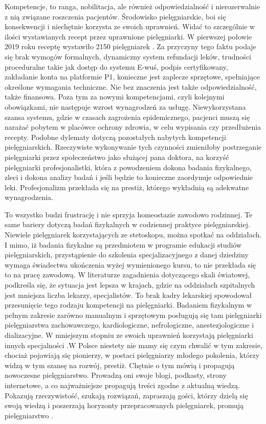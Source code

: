 \documentclass[a4paper,12pt,twoside,openright]{mwrep}
\begin{document}
Kompetencje, to ranga, nobilitacja, ale również odpowiedzialność i nierozerwalnie z nią związane roszczenia pacjentów. Środowisko pielęgniarskie, boi się konsekwencji i niechętnie korzysta ze swoich uprawnień. Widać to szczególnie w ilości wystawianych recept przez uprawnione pielęgniarki. W pierwszej połowie 2019 roku receptę wystawiło 2150 pielęgniarek \cite{model}. Za przyczyny tego faktu podaje się brak wymogów formalnych, dynamiczny system refundacji leków, trudności proceduralne takie jak dostęp do systemu E-wuś, podpis certyfikowany, zakładanie konta na platformie P1, konieczne jest zaplecze sprzętowe, spełniające określone wymagania techniczne.  Nie bez znaczenia jest także odpowiedzialność, także finansowa. Poza tym za nowymi kompetencjami, czyli kolejnymi obowiązkami, nie następuje wzrost wynagrodzeń za usługę. Niewykorzystana szansa systemu, gdzie w czasach zagrożenia epidemicznego, pacjenci muszą się narażać pobytem w placówce ochrony zdrowia, w celu wypisania czy przedłużenia recepty. Podobne dylematy dotyczą pozostałych nabytych kompetencji pielęgniarskich. Rzeczywiste wykonywanie tych czynności zmieniłoby postrzeganie pielęgniarki przez społeczeństwo jako służącej pana doktora, na korzyść pielęgniarki profesjonalistki, która z powodzeniem dokona badania fizykalnego, zleci i dokona analizy badań i jeśli będzie to konieczne zaordynuje odpowiednie leki. Profesjonalizm przekłada się na prestiż, którego wykładnią są adekwatne wynagrodzenia. 

To wszystko budzi frustrację i nie sprzyja homeostazie zawodowo rodzinnej.  Te same bariery dotyczą badań fizykalnych w codziennej praktyce pielęgniarskiej. Niewiele  pielęgniarek  korzystających ze stetoskopu,  można spotkać na oddziałach. I mimo, iż badania fizykalne są przedmiotem w programie edukacji studiów pielęgniarskich, przystąpienie do szkolenia specjalizacyjnego z danej dziedziny wymaga świadectwa ukończenia wyżej wymienionego kursu, to nie przekłada się to na pracę zawodową. W literaturze zagadnienia dotyczącego skali światowej, podkreśla się, że sytuacja jest lepsza w krajach, gdzie na oddziałach szpitalnych jest mniejsza liczba lekarzy, specjalistów. To brak kadry lekarskiej spowodował przesunięcie tego rodzaju kompetencji na pielęgniarki. Badaniem fizykalnym w pełnym zakresie zarówno manualnym i sprzętowym posługują się tam pielęgniarki pielęgniarstwa zachowawczego, kardiologiczne, nefrologiczne, anestezjologiczne i dializacyjne. W mniejszym stopniu ze swoich uprawnień korzystają pielęgniarki innych specjalności \cite{badania}.W Polsce niestety nie mamy się czym chwalić w tym zakresie, chociaż pojawiają się pionierzy, w postaci pielęgniarzy młodego pokolenia, którzy widzą w tym szansę na rozwój, prestiż. Chętnie o tym mówią i propagują nowoczesne pielęgniarstwo. Prowadzą oni swoje blogi, podkasty, strony internetowe, a co najważniejsze propagują treści zgodne z aktualną wiedzą.  Pokazują rzeczywistość, szukają rozwiązań, zapraszają gości, którzy dzielą się swoją wiedzą i poszerzają horyzonty przepracowanych pielęgniarek, promują pielęgniarstwo \cite{spoty}.
\end{document}
